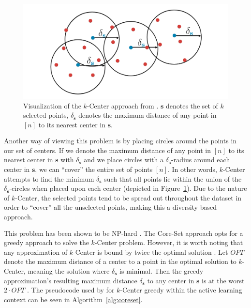 \documentclass[english,bachelor,ul]{webisthesis} %
\begin{document}
\begin{figure}[htbp]
    \centering
    \includegraphics[width=1\textwidth]{img/core-set.png}
    \caption{Visualization of the $k$-Center approach from \cite{DBLP:conf/iclr/SenerS18}. $ \mathbf{s} $ denotes the set of $ k $ selected points, $ \delta_{\mathbf{s}} $ denotes the maximum distance of any point in $ [n] $ to its nearest center in $ \mathbf{s} $.}
    \label{fig:coreset}
\end{figure}

Another way of viewing this problem is by placing circles around the points in our set of centers. If we denote the maximum distance of any point in $ [n] $ to its nearest center in $ \mathbf{s} $ with $ \delta_{\mathbf{s}} $ and we place circles with a $ \delta_{\mathbf{s}} $-radius around each center in $ \mathbf{s} $, we can ``cover'' the entire set of points $ [n] $. In other words, $k$-Center attempts to find the minimum $ \delta_{\mathbf{s}} $ such that all points lie within the union of the $ \delta_{\mathbf{s}} $-circles when placed upon each center (depicted in Figure~\ref{fig:coreset}). Due to the nature of $k$-Center, the selected points tend to be spread out throughout the dataset in order to ``cover'' all the unselected points, making this a diversity-based approach. 

This problem has been shown to be NP-hard \citep{DBLP:journals/dam/HsuN79, DBLP:journals/anor/Hochbaum84}. The Core-Set approach opts for a greedy approach to solve the $k$-Center problem. However, it is worth noting that any approximation of $k$-Center is bound by twice the optimal solution \citep{DBLP:journals/dam/HsuN79}. Let $ OPT $ denote the maximum distance of a center to a point in the optimal solution to $k$-Center, meaning the solution where $\delta_{\mathbf{s}} $ is minimal. Then the greedy approximation's resulting maximum distance $ \delta_{\mathbf{s}} $ to any center in $ \mathbf{s} $ is at the worst $ 2 \cdot OPT $ \citep{mountkcenter}. The pseudocode used by \cite{DBLP:conf/iclr/SenerS18} for $k$-Center greedy within the active learning context can be seen in Algorithm~\ref{alg:coreset}.
\end{document}
